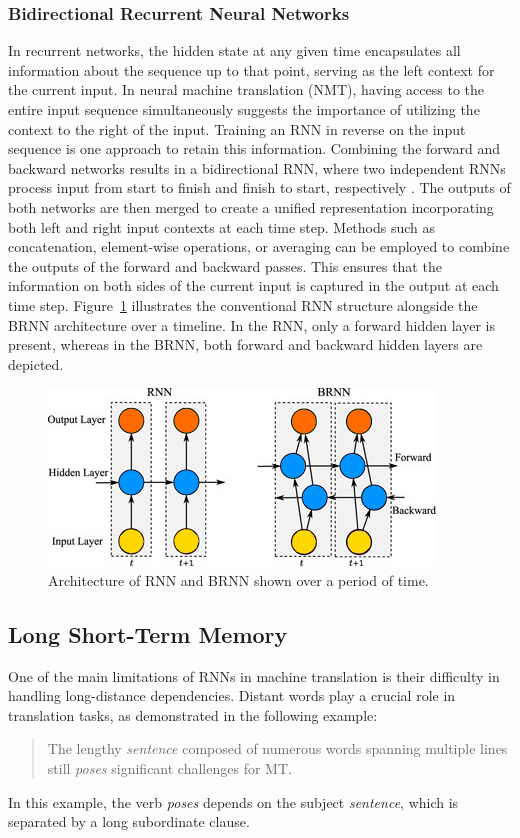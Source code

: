 \subsubsection{Bidirectional Recurrent Neural Networks}
In recurrent networks, the hidden state at any given time encapsulates all information about the sequence up to that point, serving as the left context for the current input. 
In neural machine translation (NMT), having access to the entire input sequence simultaneously suggests the importance of utilizing the context to the right of the input. 
Training an RNN in reverse on the input sequence is one approach to retain this information. 
Combining the forward and backward networks results in a bidirectional RNN, where two independent RNNs process input from start to finish and finish to start, respectively \cite{schuster97}. 
The outputs of both networks are then merged to create a unified representation incorporating both left and right input contexts at each time step. 
Methods such as concatenation, element-wise operations, or averaging can be employed to combine the outputs of the forward and backward passes. 
This ensures that the information on both sides of the current input is captured in the output at each time step.
Figure~\ref{fig:rnn-brnn} illustrates the conventional RNN structure alongside the BRNN architecture over a timeline. In the RNN, only a forward hidden layer is present, whereas in the BRNN, both forward and backward hidden layers are depicted.

\begin{figure}[h]
	\centering
	\includegraphics[width=0.9\linewidth]{Figures/RNN-BRNN}
	\caption{Architecture of RNN and BRNN shown over a period of time.}
	\label{fig:rnn-brnn}
\end{figure}

\subsection{Long Short-Term Memory}
One of the main limitations of RNNs in machine translation is their difficulty in handling long-distance dependencies. Distant words play a crucial role in translation tasks, as demonstrated in the following example:
\begin{quotation}
	The lengthy \textit{sentence} composed of numerous words spanning multiple lines still \textit{poses} significant challenges for MT.
\end{quotation}
In this example, the verb \textit{poses} depends on the subject \textit{sentence}, which is separated by a long subordinate clause.


